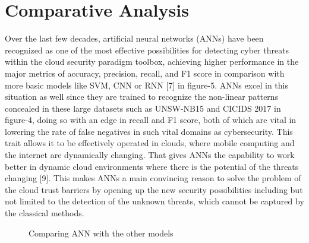 \documentclass{llncs}
\begin{document}
\section{Comparative Analysis}
Over the last few decades, artificial neural networks (ANNs) have been recognized as one of the most effective possibilities for detecting cyber threats within the cloud security paradigm toolbox, achieving higher performance in the major metrics of accuracy, precision, recall, and F1 score in comparison with more basic models like SVM, CNN or RNN [7] in figure-5. ANNs excel in this situation as well since they are trained to recognize the non-linear patterns concealed in these large datasets such as UNSW-NB15 and CICIDS 2017 in figure-4, doing so with an edge in recall and F1 score, both of which are vital in lowering the rate of false negatives in such vital domains as cybersecurity. This trait allows it to be effectively operated in clouds, where mobile computing and the internet are dynamically changing. That gives ANNs the capability to work better in dynamic cloud environments where there is the potential of the threats changing [9]. This makes ANNs a main convincing reason to solve the problem of the cloud trust barriers by opening up the new security possibilities including but not limited to the detection of the unknown threats, which cannot be captured by the classical methods.
\begin{figure}[htbp]
\hspace{-0.8cm}
    \caption{\small{Comparing ANN with the other models}}
    \label{fig:abc}
\end{figure}
\end{document}

